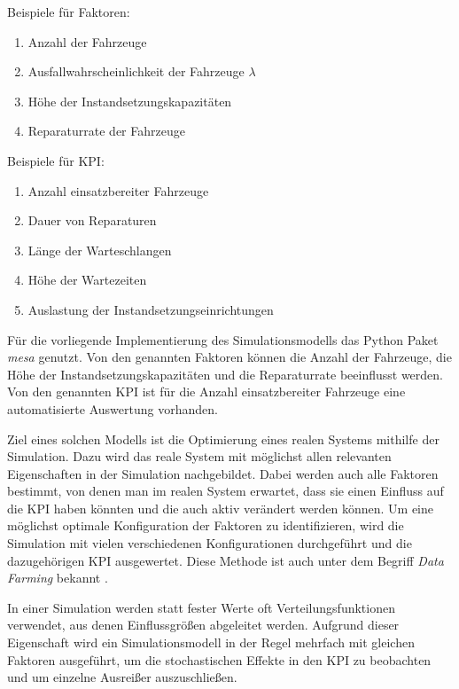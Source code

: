 \documentclass[11pt,a4paper]{article}
\begin{document}
Beispiele für Faktoren:
\begin{enumerate}
	\item Anzahl der Fahrzeuge
	\item Ausfallwahrscheinlichkeit der Fahrzeuge $\lambda$
	\item Höhe der Instandsetzungskapazitäten
	\item Reparaturrate der Fahrzeuge
\end{enumerate}
Beispiele für KPI:
\begin{enumerate}
	\item Anzahl einsatzbereiter Fahrzeuge
	\item Dauer von Reparaturen
	\item Länge der Warteschlangen
	\item Höhe der Wartezeiten
	\item Auslastung der Instandsetzungseinrichtungen
\end{enumerate}

Für die vorliegende Implementierung des Simulationsmodells das Python Paket \emph{mesa} \cite{python-mesa-2020} genutzt.
Von den genannten Faktoren können die Anzahl der Fahrzeuge, die Höhe der Instandsetzungskapazitäten und die
Reparaturrate beeinflusst werden. Von den genannten KPI ist für die Anzahl einsatzbereiter Fahrzeuge
eine automatisierte Auswertung vorhanden.

Ziel eines solchen Modells ist die Optimierung eines realen Systems mithilfe der Simulation.
Dazu wird das reale System mit möglichst allen relevanten Eigenschaften in der Simulation nachgebildet.
Dabei werden auch alle Faktoren bestimmt, von denen man im realen System erwartet, dass sie einen Einfluss auf die KPI
haben könnten und die auch aktiv verändert werden können.
Um eine möglichst optimale Konfiguration der Faktoren zu identifizieren, wird die Simulation 
mit vielen verschiedenen Konfigurationen durchgeführt und die dazugehörigen KPI ausgewertet.
Diese Methode ist auch unter dem Begriff \emph{Data Farming} bekannt \cite{8632383}.

In einer Simulation werden statt fester Werte oft Verteilungsfunktionen verwendet, aus denen Einflussgrößen abgeleitet werden. 
Aufgrund dieser Eigenschaft wird ein Simulationsmodell in der Regel mehrfach
mit gleichen Faktoren ausgeführt, um die stochastischen Effekte in den KPI zu beobachten und
um einzelne Ausreißer auszuschließen. 
\end{document}
